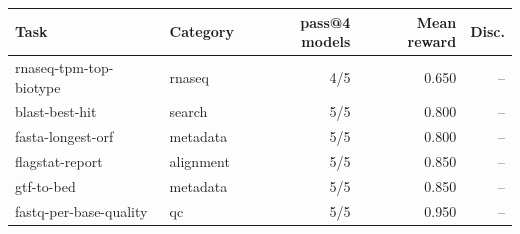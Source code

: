 \begin{tabular}{llrrr}
\toprule
Task & Category & pass@4 models & Mean reward & Disc. \\
\midrule
rnaseq-tpm-top-biotype & rnaseq & 4/5 & 0.650 & -- \\
blast-best-hit & search & 5/5 & 0.800 & -- \\
fasta-longest-orf & metadata & 5/5 & 0.800 & -- \\
flagstat-report & alignment & 5/5 & 0.850 & -- \\
gtf-to-bed & metadata & 5/5 & 0.850 & -- \\
fastq-per-base-quality & qc & 5/5 & 0.950 & -- \\
\bottomrule
\end{tabular}
